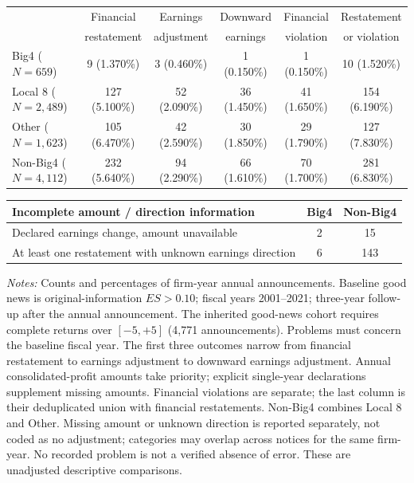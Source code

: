 \documentclass[10pt]{article}
\begin{document}
\begin{minipage}{19cm}\fontsize{10}{12}\selectfont\centering
\setlength{\tabcolsep}{4pt}\renewcommand{\arraystretch}{1.15}
\begin{tabular*}{\textwidth}{@{\extracolsep{\fill}}lccccc@{}}\toprule
 & Financial & Earnings & Downward & Financial & Restatement \\
 & restatement & adjustment & earnings & violation & or violation \\
\midrule
Big4 ($N=659$) & 9 (1.370\%) & 3 (0.460\%) & 1 (0.150\%) & 1 (0.150\%) & 10 (1.520\%) \\
Local 8 ($N=2,489$) & 127 (5.100\%) & 52 (2.090\%) & 36 (1.450\%) & 41 (1.650\%) & 154 (6.190\%) \\
Other ($N=1,623$) & 105 (6.470\%) & 42 (2.590\%) & 30 (1.850\%) & 29 (1.790\%) & 127 (7.830\%) \\
Non-Big4 ($N=4,112$) & 232 (5.640\%) & 94 (2.290\%) & 66 (1.610\%) & 70 (1.700\%) & 281 (6.830\%) \\
\bottomrule\end{tabular*}
\par\medskip
\begin{tabular*}{\textwidth}{@{\extracolsep{\fill}}lcc@{}}\toprule
Incomplete amount / direction information & Big4 & Non-Big4 \\ \midrule
Declared earnings change, amount unavailable & 2 & 15 \\
At least one restatement with unknown earnings direction & 6 & 143 \\
\bottomrule\end{tabular*}
\par\medskip\raggedright\fontsize{9}{11}\selectfont
\textit{Notes:} Counts and percentages of firm-year annual announcements. Baseline good news is original-information $ES>0.10$; fiscal years 2001--2021; three-year follow-up after the annual announcement. The inherited good-news cohort requires complete returns over $[-5,+5]$ (4,771 announcements). Problems must concern the baseline fiscal year. The first three outcomes narrow from financial restatement to earnings adjustment to downward earnings adjustment. Annual consolidated-profit amounts take priority; explicit single-year declarations supplement missing amounts. Financial violations are separate; the last column is their deduplicated union with financial restatements. Non-Big4 combines Local 8 and Other. Missing amount or unknown direction is reported separately, not coded as no adjustment; categories may overlap across notices for the same firm-year. No recorded problem is not a verified absence of error. These are unadjusted descriptive comparisons.

\end{minipage}
\end{document}
